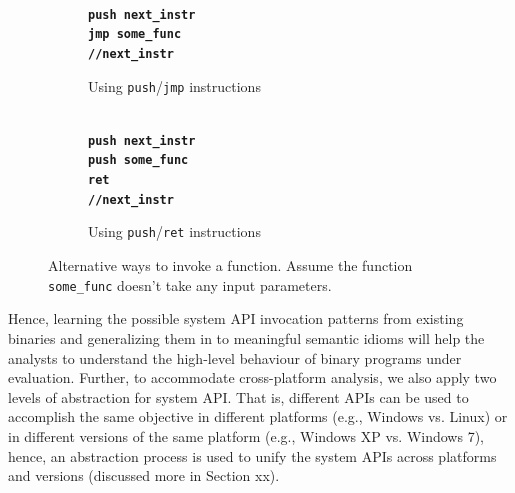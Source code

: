 \begin{figure}[t]
\scriptsize
  \begin{subfigure}[b]{0.5\linewidth}
    \centering
    \raggedright{\textbf{\texttt{
    \\
    	push  next\_instr\\
    	jmp  some\_func\\
   		//next\_instr\\
    }}}
    \caption{Using \texttt{push}/\texttt{jmp} instructions}
    \vspace{1ex}
  \end{subfigure}%
  \begin{subfigure}[b]{0.5\linewidth}
    \centering
      \raggedright{\textbf{\texttt{
      \\
   		push  next\_instr\\
    	push  some\_func\\
    	ret\\
   		//next\_instr\\
    }}}
     \caption{Using \texttt{push}/\texttt{ret} instructions}
    \vspace{1ex}
  \end{subfigure}
  \caption{Alternative ways to invoke a function. Assume the function \texttt{some\_func} doesn't take any input parameters.}
  \label{fig:altr_call_ins}
\end{figure}

\noindent Hence, learning the possible system API invocation patterns from existing binaries and generalizing them in to meaningful semantic idioms will help the analysts to understand the high-level behaviour of binary programs under evaluation.  Further, to accommodate cross-platform analysis, we also apply two levels of abstraction for system API. That is, different APIs can be used to accomplish the same objective in different platforms (e.g., Windows vs. Linux) or in different versions of the same platform (e.g., Windows XP vs. Windows 7), hence, an abstraction process is used to unify the system APIs across platforms and versions (discussed more in Section xx).

